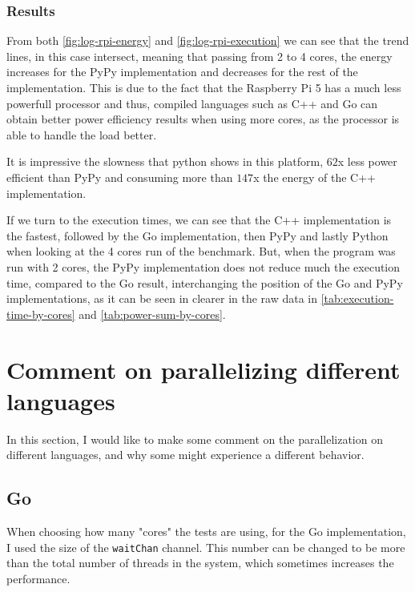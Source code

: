 \subsubsection{Results}





From both \autoref{fig:log-rpi-energy} and \autoref{fig:log-rpi-execution} we can see that the trend lines, in this case intersect, meaning that passing from 2 to 4 cores, the energy increases for the PyPy implementation and decreases for the rest of the implementation. This is due to the fact that the Raspberry Pi 5 has a much less powerfull processor and thus, compiled languages such as C++ and Go can obtain better power efficiency results when using more cores, as the processor is able to handle the load better. 

It is impressive the slowness that python shows in this platform, $62$x less power efficient than PyPy and consuming more than $147$x the energy of the C++ implementation. 

If we turn to the execution times, we can see that the C++ implementation is the fastest, followed by the Go implementation, then PyPy and lastly Python when looking at the 4 cores run of the benchmark. But, when the program was run with 2 cores, the PyPy implementation does not reduce much the execution time, compared to the Go result, interchanging the position of the Go and PyPy implementations, as it can be seen in clearer in the raw data in \autoref{tab:execution-time-by-cores} and \autoref{tab:power-sum-by-cores}.

\section{Comment on parallelizing different languages}

In this section, I would like to make some comment on the parallelization on different languages, and why some might experience a different behavior. 

\subsection{Go}
When choosing how many "cores" the tests are using, for the Go implementation, I used the size of the \texttt{waitChan} channel. This number can be changed to be more than the total number of threads in the system, which sometimes increases the performance.

